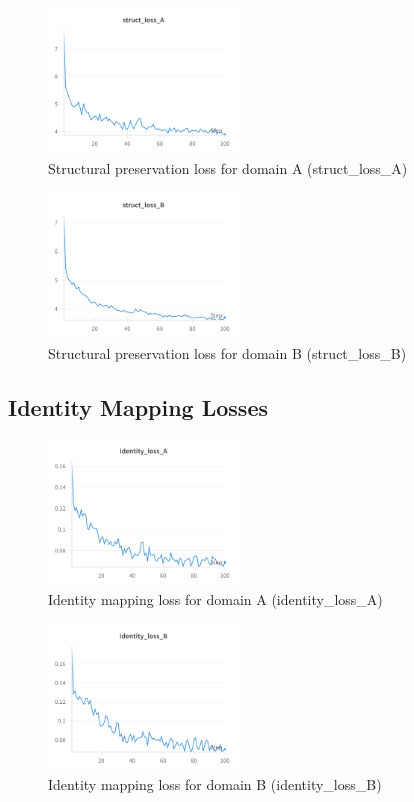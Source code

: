 \documentclass[twocolumn,superscriptaddress,aps]{revtex4-1}
\begin{document}
\begin{figure}[H]
\centering
\includegraphics[width=0.45\textwidth]{assets/struct_loss_A.png}
\caption{Structural preservation loss for domain A (struct\_loss\_A)}
\label{fig:struct_loss_A}
\end{figure}

\begin{figure}[H]
\centering
\includegraphics[width=0.45\textwidth]{assets/struct_loss_B.png}
\caption{Structural preservation loss for domain B (struct\_loss\_B)}
\label{fig:struct_loss_B}
\end{figure}

\subsection{Identity Mapping Losses}

\begin{figure}[H]
\centering
\includegraphics[width=0.45\textwidth]{assets/identity_loss_A.png}
\caption{Identity mapping loss for domain A (identity\_loss\_A)}
\label{fig:identity_loss_A}
\end{figure}

\begin{figure}[H]
\centering
\includegraphics[width=0.45\textwidth]{assets/identity_loss_B.png}
\caption{Identity mapping loss for domain B (identity\_loss\_B)}
\label{fig:identity_loss_B}
\end{figure}



\end{document}
